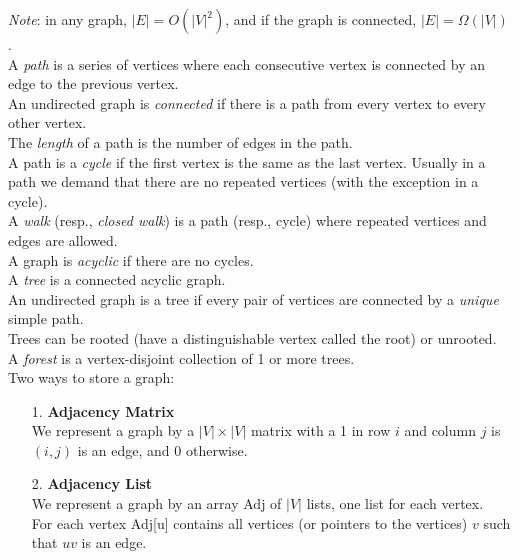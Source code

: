\documentclass[12pt]{article}
\theoremstyle{plain}
\theoremstyle{definition}
\begin{document}
\emph{Note}: in any graph, $|E| = O(|V|^{2})$, and if the graph is connected, $|E| = \Omega(|V|)$. \\

A \emph{path} is a series of vertices where each consecutive vertex is connected by an edge to the previous vertex. \\
An undirected graph is \emph{connected} if there is a path from every vertex to every other vertex. \\
The \emph{length} of a path is the number of edges in the path. \\
A path is a \emph{cycle} if the first vertex is the same as the last vertex.
Usually in a path we demand that there are no repeated vertices (with the exception in a cycle). \\
A \emph{walk} (resp., \emph{closed walk}) is a path (resp., cycle) where repeated vertices and edges are allowed. \\
A graph is \emph{acyclic} if there are no cycles. \\

A \emph{tree} is a connected acyclic graph. \\
An undirected graph is a tree if every pair of vertices are connected by a \emph{unique} simple path. \\
Trees can be rooted (have a distinguishable vertex called the root) or unrooted. \\
A \emph{forest} is a vertex-disjoint collection of 1 or more trees. \\

Two ways to store a graph:
\begin{itemize}
  \item[1.] \textbf{Adjacency Matrix} \\
  We represent a graph by a $|V| \times |V|$ matrix with a 1 in row $i$ and column $j$ is $(i, j)$ is an edge, and 0 otherwise.
  \item[2.] \textbf{Adjacency List} \\
  We represent a graph by an array Adj of $|V|$ lists, one list for each vertex. \\
  For each vertex Adj[u] contains all vertices (or pointers to the vertices) $v$ such that $uv$ is an edge.
\end{itemize}
\end{document}
